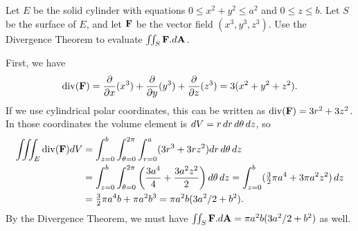 \documentclass[a4paper]{amsart}
\renewenvironment{solution}{\SolutionInline}{\endSolutionInline}
\begin{document}
\begin{exercise}
 Let $E$ be the solid cylinder with equations $0\leq x^2+y^2\leq a^2$
 and $0\leq z\leq b$.  Let $S$ be the surface of $E$, and let $\mathbf{F}$ be
 the vector field $(x^3,y^3,z^3)$.  Use the Divergence Theorem to
 evaluate $\iint_S\mathbf{F}.d\mathbf{A}$.
\end{exercise}
\begin{solution}
 First, we have 
 \[ \operatorname{div}(\mathbf{F}) = \frac{\partial}{\partial x}(x^3)+\frac{\partial}{\partial y}(y^3)+\frac{\partial}{\partial z}(z^3) = 
     3(x^2+y^2+z^2).
 \]
 If we use cylindrical polar coordinates, this can be written as
 $\operatorname{div}(\mathbf{F})=3r^2+3z^2$.  In those coordinates the volume element is
 $dV=r\,dr\,d\theta\,dz$, so
 \begin{align*}
  \iiint_E\operatorname{div}(\mathbf{F})dV 
   &= \int_{z=0}^b \int_{\theta=0}^{2\pi} \int_{r=0}^a 
       (3r^3+3rz^2) dr\,d\theta\,dz \\
   &= \int_{z=0}^b \int_{\theta=0}^{2\pi}
       \left(\frac{3a^4}{4} + \frac{3a^2z^2}{2}\right) d\theta\,dz
    = \int_{z=0}^b (\tfrac{3}{2}\pi a^4+3\pi a^2z^2)\,dz \\
   &= \tfrac{3}{2}\pi a^4b+\pi a^2b^3 = \pi a^2b(3a^2/2+b^2).
 \end{align*}
 By the Divergence Theorem, we must have
 $\iint_S\mathbf{F}.d\mathbf{A}=\pi a^2b(3a^2/2+b^2)$ as well.
\end{solution}
\end{document}
